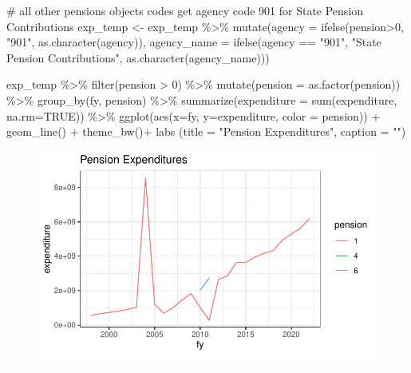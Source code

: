 \documentclass[
  letterpaper,
  DIV=11,
  numbers=noendperiod]{scrreport}
\newenvironment{Shaded}{\begin{snugshade}}{\end{snugshade}}
\newcommand{\AttributeTok}[1]{\textcolor[rgb]{0.40,0.45,0.13}{#1}}
\newcommand{\CommentTok}[1]{\textcolor[rgb]{0.37,0.37,0.37}{#1}}
\newcommand{\ConstantTok}[1]{\textcolor[rgb]{0.56,0.35,0.01}{#1}}
\newcommand{\DecValTok}[1]{\textcolor[rgb]{0.68,0.00,0.00}{#1}}
\newcommand{\FunctionTok}[1]{\textcolor[rgb]{0.28,0.35,0.67}{#1}}
\newcommand{\NormalTok}[1]{\textcolor[rgb]{0.00,0.23,0.31}{#1}}
\newcommand{\OtherTok}[1]{\textcolor[rgb]{0.00,0.23,0.31}{#1}}
\newcommand{\SpecialCharTok}[1]{\textcolor[rgb]{0.37,0.37,0.37}{#1}}
\newcommand{\StringTok}[1]{\textcolor[rgb]{0.13,0.47,0.30}{#1}}
\begin{document}
\begin{Shaded}
\begin{Highlighting}[]
\CommentTok{\# all other pensions objects  codes get agency code 901 for State Pension Contributions}
\NormalTok{exp\_temp }\OtherTok{\textless{}{-}}\NormalTok{ exp\_temp }\SpecialCharTok{\%\textgreater{}\%} 
  \FunctionTok{mutate}\NormalTok{(}\AttributeTok{agency =} \FunctionTok{ifelse}\NormalTok{(pension}\SpecialCharTok{\textgreater{}}\DecValTok{0}\NormalTok{, }\StringTok{"901"}\NormalTok{, }\FunctionTok{as.character}\NormalTok{(agency)),}
         \AttributeTok{agency\_name =} \FunctionTok{ifelse}\NormalTok{(agency }\SpecialCharTok{==} \StringTok{"901"}\NormalTok{, }\StringTok{"State Pension Contributions"}\NormalTok{, }\FunctionTok{as.character}\NormalTok{(agency\_name)))}

\NormalTok{exp\_temp }\SpecialCharTok{\%\textgreater{}\%} 
 \FunctionTok{filter}\NormalTok{(pension }\SpecialCharTok{\textgreater{}} \DecValTok{0}\NormalTok{) }\SpecialCharTok{\%\textgreater{}\%}  
  \FunctionTok{mutate}\NormalTok{(}\AttributeTok{pension =} \FunctionTok{as.factor}\NormalTok{(pension)) }\SpecialCharTok{\%\textgreater{}\%}
  \FunctionTok{group\_by}\NormalTok{(fy, pension) }\SpecialCharTok{\%\textgreater{}\%} 
  \FunctionTok{summarize}\NormalTok{(}\AttributeTok{expenditure =} \FunctionTok{sum}\NormalTok{(expenditure, }\AttributeTok{na.rm=}\ConstantTok{TRUE}\NormalTok{)) }\SpecialCharTok{\%\textgreater{}\%}
  \FunctionTok{ggplot}\NormalTok{(}\FunctionTok{aes}\NormalTok{(}\AttributeTok{x=}\NormalTok{fy, }\AttributeTok{y=}\NormalTok{expenditure, }\AttributeTok{color =}\NormalTok{ pension)) }\SpecialCharTok{+}
  \FunctionTok{geom\_line}\NormalTok{() }\SpecialCharTok{+} 
  \FunctionTok{theme\_bw}\NormalTok{()}\SpecialCharTok{+}
  \FunctionTok{labs}\NormalTok{ (}\AttributeTok{title =} \StringTok{"Pension Expenditures"}\NormalTok{, }
  \AttributeTok{caption =} \StringTok{""}\NormalTok{)}
\end{Highlighting}
\end{Shaded}

\begin{figure}[H]

{\centering \includegraphics{./Everything_files/figure-pdf/pensions-POB-1.pdf}

}

\end{figure}
\end{document}
